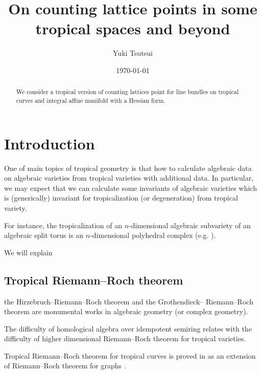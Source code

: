 \documentclass[a4paper,dvipdfmx,reqno,12pt]{amsart}
\title{On counting lattice points in some tropical spaces and beyond
}
\author[Y. Tsutsui]{Yuki Tsutsui}
\date{\today}
\theoremstyle{definition}
\numberwithin{equation}{section}
\begin{document}
\begin{abstract}
We consider a tropical version of counting lattices point for 
line bundles on tropical curves and integral affine manifold
with a Hessian form.
\end{abstract}
\maketitle
\section{Introduction}

One of main topics of tropical geometry is that 
how to calculate algebraic data on algebraic varieties
from tropical varieties with additional data.
In particular, we may expect that we can calculate
 some invariants of algebraic varieties
which is (generically) invariant for tropicalization
(or degeneration) from tropical variety.

For instance, the tropicalization of an $n$-dimensional
algebraic subvariety of an algebraic split torus 
is an $n$-dimensional polyhedral complex 
(e.g. 
\cite[Theorem 3.2.3]{maclaganIntroductionTropicalGeometry2015a}).

We will explain 

\subsection{Tropical Riemann--Roch theorem}

the Hirzebruch--Riemann--Roch theorem and the Grothendieck--
Riemann--Roch theorem are monumental works in
 algebraic geometry (or complex geometry).

The difficulty of homological algebra over idempotent 
semiring relates 
with the difficulty of higher dimensional
Riemann--Roch theorem for 
tropical varieties.

Tropical Riemann--Roch theorem for tropical curves 
is proved in \cite{gathmannRiemannRochTheoremTropical2008a}
as an extension of Riemann--Roch theorem for graphs 
\cite{MR2355607}.
\end{document}
